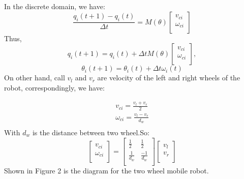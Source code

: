 \documentclass[letterpaper, 10 pt, conference]{ieeeconf}
\begin{document}
In the discrete domain, we have: 
\begin{equation}
	\frac{q_{i}(t+1)-q_{i}(t)}{\Delta{t}}=
	{M}(\theta)\left[
		\begin{array}{c}
			v_{ci}\\
			\omega_{ci}\\
		\end{array}
	\right]
\end{equation}
Thus, 
\begin{equation}
	q_{i}(t+1)=q_{i}(t)+\Delta{t}M(\theta)\left[
		\begin{array}{c}
			v_{ci}\\
			\omega_{ci}\\
		\end{array}
		\right],
\end{equation}
\begin{equation}
\theta_{i}(t+1)=\theta_{i}(t)+\Delta{t}\omega_{i}(t)
\end{equation}
On other hand, call $v_{l}$ and $v_r$ are velocity of the left and right wheels of the robot, correspondingly, we have: 

\begin{equation}
	\begin{split}
		v_{ci}=\frac{v_l+v_r}{2} \\
		\omega_{ci}=\frac{v_l-v_r}{d_{w}}\\ 
	\end{split}
\end{equation}
With $d_{w}$ is the distance between two wheel.So: 
\begin{equation}
\left[
	\begin{array}{c}
		v_{ci}\\
		\omega_{ci}\\
	\end{array}
\right]=
\left[
	\begin{array}{cc}
		\frac{1}{2}&\frac{1}{2}\\
		\frac{1}{d_{w}}&\frac{-1}{d_{w}}\\
	\end{array}
\right]
\left[
	\begin{array}{c}
		v_l\\
		v_r\\
	\end{array}
\right]
\end{equation}
Shown in Figure 2 is the diagram for the two wheel mobile robot.
\end{document}
